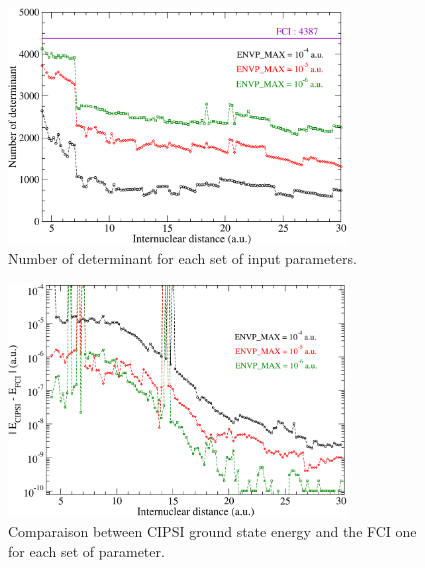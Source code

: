 \documentclass[a4paper,10pt]{article}
\begin{document}
\pagebreak

 \begin{figure}[ht!]
  \begin{center}
        \includegraphics[width=0.8\textwidth]{fig/ndet.pdf}
    \caption{\label{ndet} \small Number of determinant for each set of input parameters.}
  \end{center}
\end{figure}

 \begin{figure}[hb!]
  \begin{center}
        \includegraphics[width=0.8\textwidth]{fig/ssp1_convergence.pdf}
    \caption{\label{convergence} \small Comparaison between CIPSI ground state energy and the FCI one for each set of parameter.}
  \end{center}
\end{figure}

\pagebreak
\end{document}
